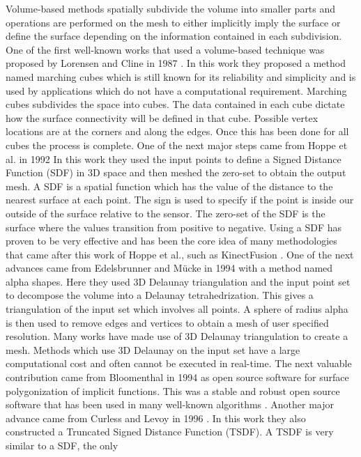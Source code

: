 \documentclass[12pt]{article}
\begin{document}
Volume-based methods spatially subdivide the volume into smaller parts and
operations are performed on the mesh to either implicitly imply the surface
or define the surface depending on the information contained in each
subdivision. One of the first well-known works that used a volume-based
technique was proposed by Lorensen and Cline in 1987 \cite{Lorensen1987}.
In this work they proposed a method named marching cubes which is still
known for its reliability and simplicity and is used by applications which
do not have a computational requirement. Marching cubes subdivides the
space into cubes. The data contained in each cube dictate how the surface
connectivity will be defined in that cube. Possible vertex locations are at
the corners and along the edges. Once this has been done for all cubes the
process is complete. One of the next major steps came from Hoppe et al. in
1992 \cite{Hoppe1992} In this work they used the input points to define a
Signed Distance Function (SDF) in 3D space and then meshed the zero-set to
obtain the output mesh. A SDF is a spatial function which has the value of
the distance to the nearest surface at each point. The sign is used to
specify if the point is inside our outside of the surface relative to the
sensor. The zero-set of the SDF is the surface where the values transition
from positive to negative. Using a SDF has proven to be very effective and
has been the core idea of many methodologies that came after this work of
Hoppe et al., such as KinectFusion \cite{Newcombe2011a}. One of the next
advances came from Edelsbrunner and M\"{u}cke in 1994
\cite{Edelsbrunner1994} with a method named alpha shapes. Here they used 3D
Delaunay triangulation and the input point set to decompose the volume into
a Delaunay tetrahedrization. This gives a triangulation of the input set
which involves all points. A sphere of radius alpha is then used to remove
edges and vertices to obtain a mesh of user specified resolution. Many
works have made use of 3D Delaunay triangulation to create a mesh. Methods
which use 3D Delaunay on the input set have a large computational cost and
often cannot be executed in real-time.  The next valuable contribution came
from Bloomenthal in 1994 \cite{Bloomenthal1994} as open source software for
surface polygonization of implicit functions. This was a stable and robust
open source software that has been used in many well-known algorithms
\cite{Newcombe2010}.  Another major advance came from Curless and Levoy in
1996 \cite{Curless1996}. In this work they also constructed a Truncated
Signed Distance Function (TSDF). A TSDF is very similar to a SDF, the only
\end{document}
